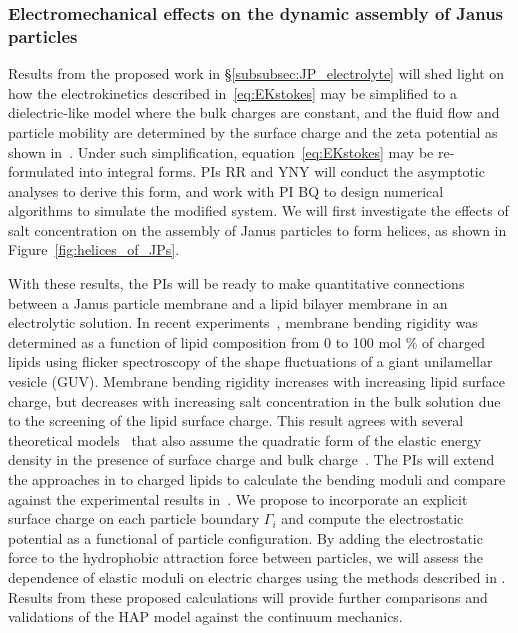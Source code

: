 \subsubsection{Electromechanical effects on the dynamic assembly of Janus particles \label{subsubsec:em_effects}}
Results from the proposed work in \S\ref{subsubsec:JP_electrolyte} will
shed light on how the electrokinetics described in~\eqref{eq:EKstokes}
may be simplified to a dielectric-like model where the bulk charges are
constant, and the fluid flow and particle mobility are determined by the
surface charge and the zeta potential as shown in~\cite{Mori2018_JFM}.
Under such simplification, equation~\eqref{eq:EKstokes} may be
re-formulated into integral forms. PIs RR and YNY will conduct the
asymptotic analyses to derive this form, and work with PI BQ to design
numerical algorithms to simulate the modified system. We will first
investigate the effects of salt concentration on the assembly of Janus
particles to form helices, as shown in Figure~\ref{fig:helices_of_JPs}.

With these results, the PIs will be ready to make quantitative
connections between a Janus particle membrane and a lipid bilayer
membrane in an electrolytic solution. In recent
experiments~\cite{FaizEtAl2019_SoftMatt}, membrane bending rigidity was
determined as a function of lipid composition from 0 to 100 mol $\%$ of
charged lipids using flicker spectroscopy of the shape fluctuations of a
giant unilamellar vesicle (GUV). Membrane bending rigidity increases
with increasing lipid surface charge, but decreases with increasing salt
concentration in the bulk solution due to the screening of the lipid
surface charge. This result agrees with several theoretical
models~\cite{Kralchevsky1996_JCIS, May1996_JChemPhys,
LoubetEtAl2013_PRE} that also assume the quadratic form of the elastic
energy density in the presence of surface charge and bulk
charge~\cite{DuplantierGoldstein1990_PRL, Winterhalter1992_JPC}.
The PIs will extend the
approaches in \cite{Fu2018_SIAM} to charged lipids to
calculate the bending moduli and compare against the experimental
results in~\cite{FaizEtAl2019_SoftMatt}. We propose to incorporate an
explicit surface charge on each particle boundary $\Gamma_i$ and compute the
electrostatic potential as a functional of particle configuration.  By
adding the electrostatic force to the hydrophobic attraction force
between particles, we will assess the dependence of elastic moduli on
electric charges using the methods described in \cite{Fu2018_SIAM}. Results from these proposed calculations
will provide further comparisons and validations of the HAP model
against the continuum mechanics.

